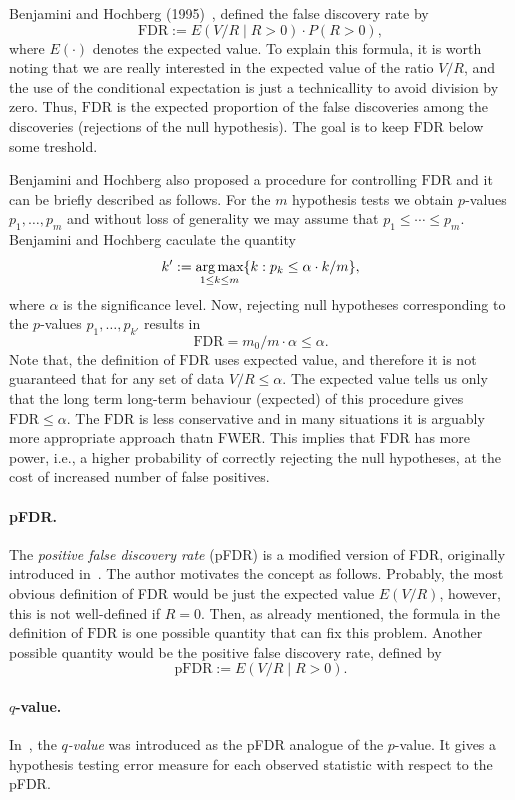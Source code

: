Benjamini and Hochberg (1995)~\cite{benjamini1995controlling}, defined the false discovery rate by
$$\text{FDR} := E(V/R \mid R > 0) \cdot P(R > 0),$$
where $E(\cdot)$ denotes the expected value.
To explain this formula, it is worth noting that we are really interested in the expected value of the ratio $V/R$, and the use of the conditional expectation is just a technicallity to avoid division by zero.
Thus, $\text{FDR}$ is the expected proportion of the false discoveries among the discoveries (rejections of the null hypothesis).
The goal is to keep $\text{FDR}$ below some treshold.


Benjamini and Hochberg also proposed a procedure for controlling $\text{FDR}$ and it can be briefly described as follows.
For the $m$ hypothesis tests we obtain $p$-values $p_1,\dots,p_m$ and without loss of generality we may assume that $p_1 \leq \cdots \leq p_m$.
Benjamini and Hochberg caculate the quantity
$$k' := \underset{1\leq k\leq m}{\text{arg\,max}}\{k : p_k \leq \alpha \cdot k/m\},$$
where $\alpha$ is the significance level.
Now, rejecting null hypotheses corresponding to the $p$-values $p_1,\dots,p_{k'}$ results in
$$\text{FDR} = m_0/m \cdot \alpha \leq \alpha.$$
Note that, the definition of $\text{FDR}$ uses expected value, and therefore it is not guaranteed that for any set of data $V/R \leq \alpha$.
The expected value tells us only that the long term long-term behaviour (expected) of this procedure gives $\text{FDR} \leq \alpha$.
The $\text{FDR}$ is less conservative and in many situations it is arguably more appropriate approach thatn $\text{FWER}$.
This implies that $\text{FDR}$ has more power, i.e., a higher probability of correctly rejecting the null hypotheses, at the cost of increased number of false positives.

\paragraph{pFDR.}
The \emph{positive false discovery rate} (pFDR) is a modified version of FDR, originally introduced in~\cite{storey2003positive}.
The author motivates the concept as follows.
Probably, the most obvious definition of FDR would be just the expected value $E(V/R)$, however, this is not well-defined if $R=0$.
Then, as already mentioned, the formula in the definition of $\text{FDR}$ is one possible quantity that can fix this problem.
Another possible quantity would be the positive false discovery rate, defined by
$$\text{pFDR} := E(V/R \mid R > 0).$$

\paragraph{$q$-value.}
In~\cite{storey2003positive}, the \emph{$q$-value} was introduced as the pFDR analogue of the $p$-value.
It gives a hypothesis testing error measure for each observed statistic with respect to the pFDR.

